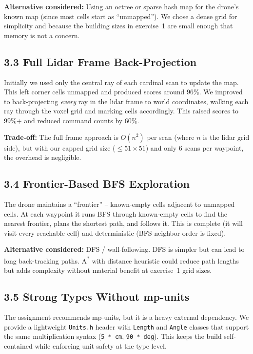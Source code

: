 \documentclass[12pt,a4paper]{article}
\begin{document}
\textbf{Alternative considered:} Using an octree or sparse hash map for the
drone's known map (since most cells start as ``unmapped''). We chose a dense
grid for simplicity and because the building sizes in exercise~1 are small
enough that memory is not a concern.

\subsection{3.3 Full Lidar Frame Back-Projection}

Initially we used only the central ray of each cardinal scan to update the map.
This left corner cells unmapped and produced scores around 96\%. We improved
to back-projecting \emph{every} ray in the lidar frame to world coordinates,
walking each ray through the voxel grid and marking cells accordingly. This
raised scores to 99\%+ and reduced command counts by 60\%.

\textbf{Trade-off:} The full frame approach is $O(n^2)$ per scan (where $n$
is the lidar grid side), but with our capped grid size ($\le 51 \times 51$)
and only 6 scans per waypoint, the overhead is negligible.

\subsection{3.4 Frontier-Based BFS Exploration}

The drone maintains a ``frontier'' -- known-empty cells adjacent to unmapped
cells. At each waypoint it runs BFS through known-empty cells to find the
nearest frontier, plans the shortest path, and follows it. This is complete
(it will visit every reachable cell) and deterministic (BFS neighbor order
is fixed).

\textbf{Alternative considered:} DFS / wall-following. DFS is simpler but can
lead to long back-tracking paths. A\textsuperscript{*} with distance heuristic
could reduce path lengths but adds complexity without material benefit at
exercise~1 grid sizes.

\subsection{3.5 Strong Types Without mp-units}

The assignment recommends mp-units, but it is a heavy external dependency.
We provide a lightweight \texttt{Units.h} header with \texttt{Length} and
\texttt{Angle} classes that support the same multiplication syntax
(\texttt{5 * cm}, \texttt{90 * deg}). This keeps the build self-contained
while enforcing unit safety at the type level.
\end{document}
